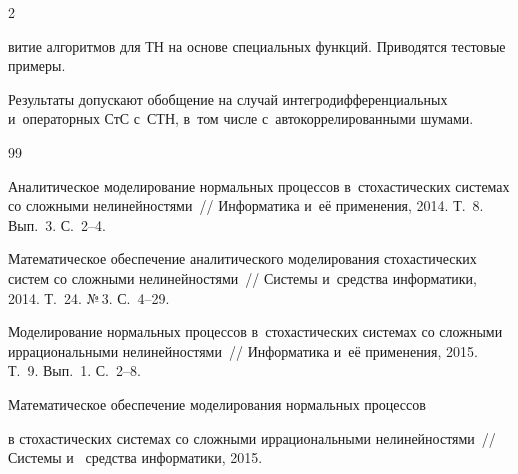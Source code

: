 \begin{multicols}{2}
 \pagebreak



 \noindent

витие алгоритмов для ТН на основе специальных функций. Приводятся тестовые примеры.



Результаты допускают обобщение на случай интегродифференциальных и~операторных СтС с~СТН,  в~том числе с~автокоррелированными шумами.





{\small\frenchspacing

 {%


 \begin{thebibliography}{99}





Аналитическое моделирование нормальных процессов в~стохастических системах со сложными нелинейностями~// Информатика и~её применения, 2014. Т.~8. Вып.~3. С.~2--4.





Математическое обеспечение аналитического моделирования стохастических систем со сложными нелинейностями~// Системы и~средства информатики, 2014. Т.~24. №\,3. С.~4--29.





Моделирование нормальных процессов в~стохастических системах со сложными иррациональными нелинейностями~// Информатика и~её применения, 2015. Т.~9. Вып.~1. С.~2--8.





Математическое обеспечение моделирования нормальных процессов

в стохастических системах со сложными иррациональными нелинейностями~// Системы и~ средства информатики, 2015.


\end{thebibliography}}}
\end{multicols}
